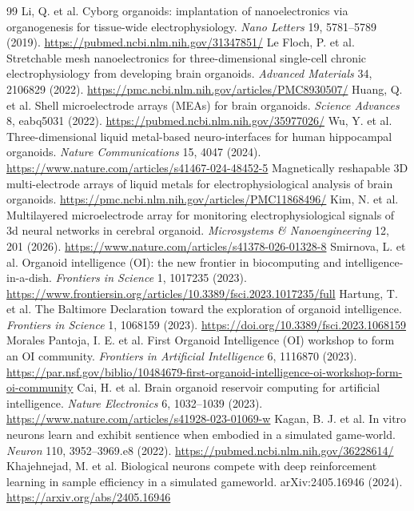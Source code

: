 \documentclass[10pt,twocolumn]{article}
\begin{document}
\begin{thebibliography}{99}
 Li, Q. et al. Cyborg organoids: implantation of nanoelectronics via organogenesis for tissue-wide electrophysiology. \emph{Nano Letters} 19, 5781--5789 (2019). \url{https://pubmed.ncbi.nlm.nih.gov/31347851/}
 Le Floch, P. et al. Stretchable mesh nanoelectronics for three-dimensional single-cell chronic electrophysiology from developing brain organoids. \emph{Advanced Materials} 34, 2106829 (2022). \url{https://pmc.ncbi.nlm.nih.gov/articles/PMC8930507/}
 Huang, Q. et al. Shell microelectrode arrays (MEAs) for brain organoids. \emph{Science Advances} 8, eabq5031 (2022). \url{https://pubmed.ncbi.nlm.nih.gov/35977026/}
 Wu, Y. et al. Three-dimensional liquid metal-based neuro-interfaces for human hippocampal organoids. \emph{Nature Communications} 15, 4047 (2024). \url{https://www.nature.com/articles/s41467-024-48452-5}
 Magnetically reshapable 3D multi-electrode arrays of liquid metals for electrophysiological analysis of brain organoids. \url{https://pmc.ncbi.nlm.nih.gov/articles/PMC11868496/}
 Kim, N. et al. Multilayered microelectrode array for monitoring electrophysiological signals of 3d neural networks in cerebral organoid. \emph{Microsystems \& Nanoengineering} 12, 201 (2026). \url{https://www.nature.com/articles/s41378-026-01328-8}
 Smirnova, L. et al. Organoid intelligence (OI): the new frontier in biocomputing and intelligence-in-a-dish. \emph{Frontiers in Science} 1, 1017235 (2023). \url{https://www.frontiersin.org/articles/10.3389/fsci.2023.1017235/full}
 Hartung, T. et al. The Baltimore Declaration toward the exploration of organoid intelligence. \emph{Frontiers in Science} 1, 1068159 (2023). \url{https://doi.org/10.3389/fsci.2023.1068159}
 Morales Pantoja, I. E. et al. First Organoid Intelligence (OI) workshop to form an OI community. \emph{Frontiers in Artificial Intelligence} 6, 1116870 (2023). \url{https://par.nsf.gov/biblio/10484679-first-organoid-intelligence-oi-workshop-form-oi-community}
 Cai, H. et al. Brain organoid reservoir computing for artificial intelligence. \emph{Nature Electronics} 6, 1032--1039 (2023). \url{https://www.nature.com/articles/s41928-023-01069-w}
 Kagan, B. J. et al. In vitro neurons learn and exhibit sentience when embodied in a simulated game-world. \emph{Neuron} 110, 3952--3969.e8 (2022). \url{https://pubmed.ncbi.nlm.nih.gov/36228614/}
 Khajehnejad, M. et al. Biological neurons compete with deep reinforcement learning in sample efficiency in a simulated gameworld. arXiv:2405.16946 (2024). \url{https://arxiv.org/abs/2405.16946}

\end{thebibliography}
\end{document}
